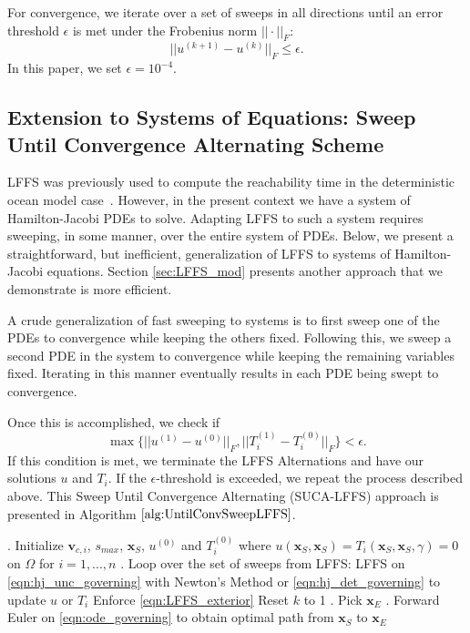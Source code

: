 \documentclass[pdflatex,sn-mathphys-num]{sn-jnl}%
\def \bx{{\mathbf {x}}}
\def \bv{{\mathbf {v}}}
\theoremstyle{thmstyleone}%
\theoremstyle{thmstyletwo}%
\theoremstyle{thmstylethree}%
\begin{document}
For convergence, we iterate over a set of sweeps in all directions until an error threshold $\epsilon$ is met under the Frobenius norm $||\cdot||_F$:
$$
    || u^{(k+1)} - u^{(k)} ||_F \leq \epsilon.
$$
In this paper, we set $\epsilon= 10^{-4}$.




\subsection{Extension to Systems of Equations: Sweep Until Convergence Alternating Scheme}
\label{sec:LFFS_ext}

LFFS was previously used to compute the reachability time in the deterministic ocean model case~\cite{Brandman2023}.  However, in the present context we have a system of Hamilton-Jacobi PDEs to solve.  Adapting LFFS to such a system requires sweeping, in some manner, over the entire system of PDEs.  
Below, we present a straightforward, but inefficient, generalization of LFFS to systems of Hamilton-Jacobi equations.  Section \ref{sec:LFFS_mod} presents another approach that we demonstrate is more efficient.  


A crude generalization of fast sweeping to systems is to first sweep one of the PDEs to convergence while keeping the others fixed.  Following this, we sweep a second PDE in the system to convergence while keeping the remaining variables fixed.  Iterating in this manner eventually results in each PDE being swept to convergence.


Once this is accomplished, we check if
$$
\max \{||u^{(1)}-u^{(0)}||_F,{||T_{i}^{(1)}-T_{i}^{(0)}||_F} \}<\epsilon.
$$
If this condition is met, we terminate the LFFS Alternations and have our solutions $u$ and $T_i$.  If the $\epsilon$-threshold is exceeded, we repeat the process described above.  This Sweep Until Convergence Alternating (SUCA-LFFS) approach is presented in Algorithm $\ref{alg:UntilConvSweepLFFS}$.


\begin{algorithm} [!h]
\scriptsize
\caption{Path Planning with Uncertainty - Sweep Until Convergence Alternating LFFS Scheme (SUCA-LFFS)}\label{alg:UntilConvSweepLFFS}
\begin{algorithmic}
. Initialize ${\bv_{c,i}}$, $s_{max}$, $\bx_S$, $u^{(0)}$ and ${T_i^{(0)}}$ where ${u(\bx_S,\bx_S)=T_i(\bx_S,\bx_S,\gamma)=0}$ on $\Omega$ for $i=1,...,n$
. Loop over the set of sweeps from LFFS:
\State LFFS on {\eqref{eqn:hj_unc_governing} with Newton's Method or \eqref{eqn:hj_det_governing} to update $u$ or $T_i$}
\State Enforce \eqref{eqn:LFFS_exterior}
\EndFor
\EndWhile
\State  Reset $k$ to 1
\EndFor
\EndWhile
{}. Pick $\bx_E$
. Forward Euler on \eqref{eqn:ode_governing} to obtain optimal path from $\bx_S$ to $\bx_E$
\end{algorithmic}
\end{algorithm}
\end{document}
